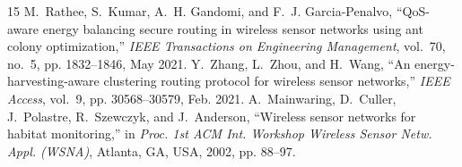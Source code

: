 \documentclass[conference]{IEEEtran}
\begin{document}
\begin{thebibliography}{15}
M.~Rathee, S.~Kumar, A.~H. Gandomi, and F.~J. Garcia-Penalvo, ``QoS-aware energy balancing secure routing in wireless sensor networks using ant colony optimization,'' \textit{IEEE Transactions on Engineering Management}, vol.~70, no.~5, pp. 1832--1846, May 2021.
Y.~Zhang, L.~Zhou, and H.~Wang, ``An energy-harvesting-aware clustering routing protocol for wireless sensor networks,'' \textit{IEEE Access}, vol.~9, pp. 30568--30579, Feb. 2021.
A.~Mainwaring, D.~Culler, J.~Polastre, R.~Szewczyk, and J.~Anderson, ``Wireless sensor networks for habitat monitoring,'' in \textit{Proc. 1st ACM Int. Workshop Wireless Sensor Netw. Appl. (WSNA)}, Atlanta, GA, USA, 2002, pp. 88--97.
\end{thebibliography}
\end{document}
